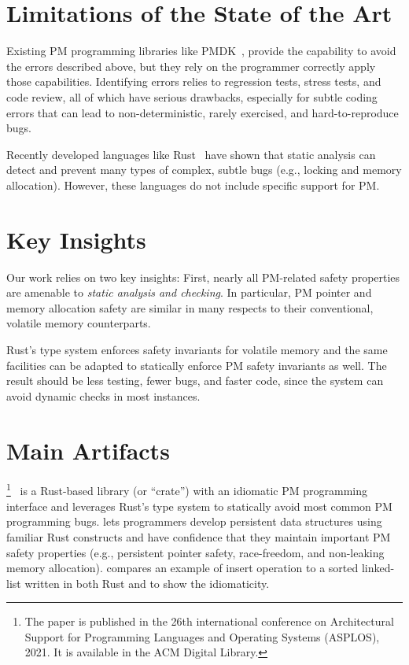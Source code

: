 \documentclass[pageno]{jpaper}
\theoremstyle{invar}
\theoremstyle{goal}
\begin{document}
\section{Limitations of the State of the Art}
\label{sec:limitations}

Existing PM programming libraries like PMDK~\cite{pmdk}, provide the capability to
avoid the errors described above, but they rely on the programmer correctly
apply those capabilities.  Identifying errors relies to regression tests,
stress tests, and code review, all of which have serious drawbacks, especially
for subtle coding errors that can lead to non-deterministic, rarely exercised,
and hard-to-reproduce bugs.

Recently developed languages like Rust~\cite{rust} have shown that static analysis can detect and
prevent many types of complex, subtle bugs (e.g., locking and memory
allocation).  However, these languages do not include specific support for PM.


\section{Key Insights}
\label{sec:key-insights}
 
Our work relies on two key insights: First, nearly all PM-related safety
properties are amenable to \emph{static analysis and checking}.  In particular, PM pointer and
memory allocation safety are similar in many respects to their conventional,
volatile memory counterparts.

Rust's type system enforces safety invariants for volatile memory and the same
facilities can be adapted to statically enforce PM safety invariants as well.
The result should be less testing, fewer bugs, and faster code, since the
system can avoid dynamic checks in most instances.

\section{Main Artifacts}
\label{sec:main-artifacts}

\this{}\footnote{The paper is published in the 26th international conference on Architectural Support for Programming Languages and Operating Systems (ASPLOS), 2021. It is available in the ACM Digital Library.}~\cite{corundum} is a Rust-based library (or ``crate'') with an idiomatic PM
programming interface and leverages Rust’s type system to statically avoid most
common PM programming bugs.
\This{} lets programmers develop persistent data structures using familiar Rust
constructs and have confidence that they maintain important PM safety
properties (e.g., persistent pointer safety, race-freedom, and non-leaking memory allocation).
 compares an example of insert operation to a sorted linked-list written in both Rust and \this{} to show the idiomaticity.
\end{document}
